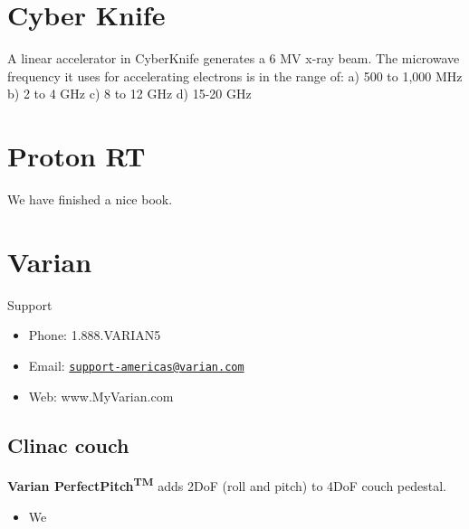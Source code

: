 \documentclass[]{book}
\providecommand{\tightlist}{%
  \setlength{\itemsep}{0pt}\setlength{\parskip}{0pt}}
\theoremstyle{definition}
\theoremstyle{definition}
\theoremstyle{definition}
\theoremstyle{remark}
\begin{document}
\chapter{Cyber Knife}\label{cyber-knife}

A linear accelerator in CyberKnife generates a 6 MV x-ray beam. The
microwave frequency it uses for accelerating electrons is in the range
of: a) 500 to 1,000 MHz b) 2 to 4 GHz c) 8 to 12 GHz d) 15-20 GHz

\chapter{Proton RT}\label{proton}

We have finished a nice book.

\chapter{Varian}\label{varian}

Support

\begin{itemize}
\tightlist
\item
  Phone: 1.888.VARIAN5
\item
  Email:
  \href{mailto:support-americas@varian.com}{\nolinkurl{support-americas@varian.com}}
\item
  Web: www.MyVarian.com
\end{itemize}

\section{Clinac couch}\label{clinac-couch}

\textbf{Varian PerfectPitch\textsuperscript{TM}} adds 2DoF (roll and
pitch) to 4DoF couch pedestal.

\begin{itemize}
\tightlist
\item
  We
\end{itemize}


\end{document}
